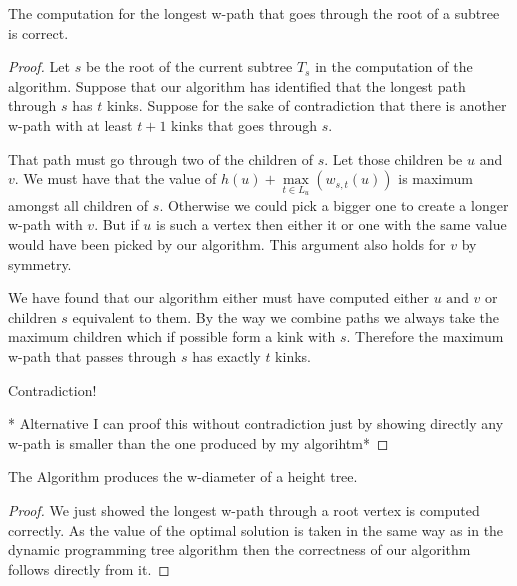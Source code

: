 \begin{lem} The computation for the longest w-path that goes through the root of a subtree is correct. \end{lem}
\begin{proof}
    Let $s$ be the root of the current subtree $T_s$ in the computation of the algorithm. Suppose that our algorithm has identified that the longest path through $s$ has $t$ kinks. Suppose for the sake of contradiction that there is another w-path with at least $t+1$ kinks that goes through $s$.

    That path must go through two of the children of $s$. Let those children be $u$ and $v$. We must have that the value of $h(u) + \max\limits_{t \in L_u}(w_{s, t}(u))$ is maximum amongst all children of $s$. Otherwise we could pick a bigger one to create a longer w-path with $v$. But if $u$ is such a vertex then either it or one with the same value would have been picked by our algorithm. This argument also holds for $v$ by symmetry.

    We have found that our algorithm either must have computed either $u \text{ and } v$ or children $s$ equivalent to them. By the way we combine paths we always take the maximum children which if possible form a kink with $s$. Therefore the maximum w-path that passes through $s$ has exactly $t$ kinks.

    Contradiction!

    * Alternative I can proof this without contradiction just by showing directly any w-path is smaller than the one produced by my algorihtm*

\end{proof}


\begin{lem} The Algorithm produces the w-diameter of a height tree. \end{lem}

\begin{proof}

    We just showed the longest w-path through a root vertex is computed correctly. As the value of the optimal solution is taken in the same way as in the dynamic programming tree algorithm then the correctness of our algorithm follows directly from it.

\end{proof}



